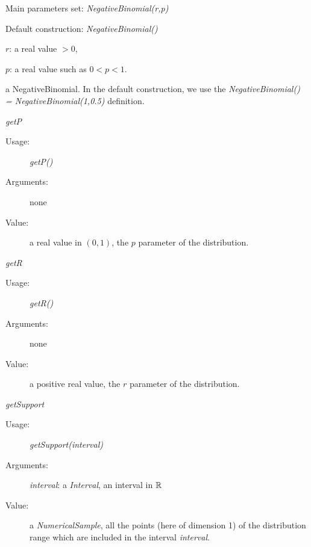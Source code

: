 \begin{description}

\item[Usage:]\rule{0pt}{1em}
\begin{description}
\item Main parameters set: \textit{NegativeBinomial(r,p)}
\item Default construction: \textit{NegativeBinomial()}
\end{description}

\item[Arguments:]  \rule{0pt}{1em}
\begin{description}
\item $r$: a real value $>0$,
\item  $p$: a real value such as $0 < p < 1$.
\end{description}

\item[Value:] a NegativeBinomial. In the default construction, we use the \textit{NegativeBinomial() = NegativeBinomial(1,0.5)} definition.

\item[Some methods:] \rule{0pt}{1em}
\begin{description}

\item \textit{getP}
\begin{description}
\item[Usage:] \textit{getP()}
\item[Arguments:] none
\item[Value:]  a real value in $(0, 1)$, the $p$ parameter of the distribution.
\end{description}
\bigskip

\item \textit{getR}
\begin{description}
\item[Usage:] \textit{getR()}
\item[Arguments:] none
\item[Value:]  a positive real value, the $r$ parameter of the distribution.
\end{description}
\bigskip

\item \textit{getSupport}
\begin{description}
\item[Usage:] \textit{getSupport(interval)}
\item[Arguments:] \textit{interval}: a \textit{Interval}, an interval in ${\mathbb R}$
\item[Value:]  a \textit{NumericalSample}, all the points (here of dimension 1) of the distribution range which are included in the interval \textit{interval}.
\end{description}


\end{description}
\end{description}
